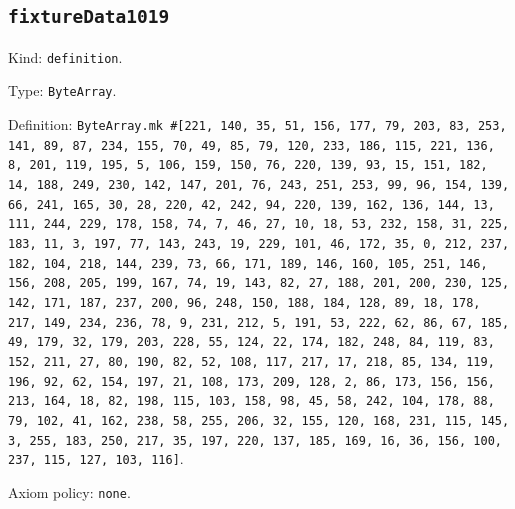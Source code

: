 \documentclass[11pt]{article}
\begin{document}
\subsection*{\texttt{fixtureData1019}}
\noindent Kind: \texttt{definition}.\par
\noindent Type: \texttt{ByteArray}.\par
\noindent Definition: \texttt{ByteArray.mk \#[221, 140, 35, 51, 156, 177, 79, 203, 83, 253, 141, 89, 87, 234, 155, 70, 49, 85, 79, 120, 233, 186, 115, 221, 136, 8, 201, 119, 195, 5, 106, 159, 150, 76, 220, 139, 93, 15, 151, 182, 14, 188, 249, 230, 142, 147, 201, 76, 243, 251, 253, 99, 96, 154, 139, 66, 241, 165, 30, 28, 220, 42, 242, 94, 220, 139, 162, 136, 144, 13, 111, 244, 229, 178, 158, 74, 7, 46, 27, 10, 18, 53, 232, 158, 31, 225, 183, 11, 3, 197, 77, 143, 243, 19, 229, 101, 46, 172, 35, 0, 212, 237, 182, 104, 218, 144, 239, 73, 66, 171, 189, 146, 160, 105, 251, 146, 156, 208, 205, 199, 167, 74, 19, 143, 82, 27, 188, 201, 200, 230, 125, 142, 171, 187, 237, 200, 96, 248, 150, 188, 184, 128, 89, 18, 178, 217, 149, 234, 236, 78, 9, 231, 212, 5, 191, 53, 222, 62, 86, 67, 185, 49, 179, 32, 179, 203, 228, 55, 124, 22, 174, 182, 248, 84, 119, 83, 152, 211, 27, 80, 190, 82, 52, 108, 117, 217, 17, 218, 85, 134, 119, 196, 92, 62, 154, 197, 21, 108, 173, 209, 128, 2, 86, 173, 156, 156, 213, 164, 18, 82, 198, 115, 103, 158, 98, 45, 58, 242, 104, 178, 88, 79, 102, 41, 162, 238, 58, 255, 206, 32, 155, 120, 168, 231, 115, 145, 3, 255, 183, 250, 217, 35, 197, 220, 137, 185, 169, 16, 36, 156, 100, 237, 115, 127, 103, 116]}.\par
\noindent Axiom policy: \texttt{none}.\par
\end{document}
